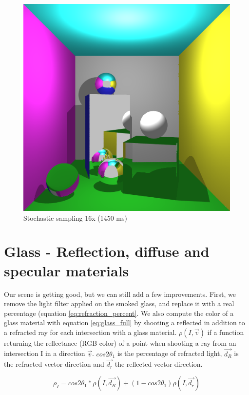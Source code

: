\begin{figure}[H]
    \includegraphics[width=\linewidth]{img/antialiasing/stoAA16x_full.png}
    \caption{Stochastic sampling 16x (1450 ms)}
\endminipage
\end{figure}


\section{Glass - Reflection, diffuse and specular materials}
Our scene is getting good, but we can still add a few improvements. First, we remove the light filter applied on the smoked glass, and replace it with a real percentage (equation \ref{eq:refraction_percent}. We also compute the color of a glass material with equation \ref{eq:glass_full} by shooting a reflected in addition to a refracted ray for each intersection with a glass material. $\rho(I, \vec{v})$ if a function returning the reflectance (RGB color) of a point when shooting a ray from an intersection I in a direction $\vec{v}$. $cos2\theta_1$ is the percentage of refracted light, $\vec{d_R}$ is the refracted vector direction and $\vec{d_r}$ the reflected vector direction.

\begin{equation}
\rho_I = cos2\theta_1 * \rho(I, \vec{d_R}) + (1 - cos2\theta_1) \rho(I, \vec{d_r})
\label{eq:glass_full}
\end{equation}

